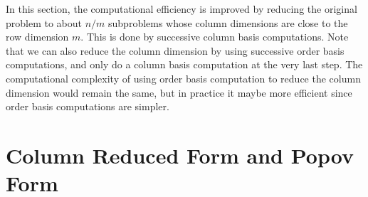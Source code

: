 \begin{rem}
In this section, the computational efficiency is improved by reducing
the original problem to about $n/m$ subproblems whose column dimensions
are close to the row dimension $m$. This is done by successive column
basis computations. Note that we can also reduce the column dimension
by using successive order basis computations, and only do a column
basis computation at the very last step. The computational complexity
of using order basis computation to reduce the column dimension would
remain the same, but in practice it maybe more efficient since order
basis computations are simpler.
\end{rem}

\section{Column Reduced Form and Popov Form}

